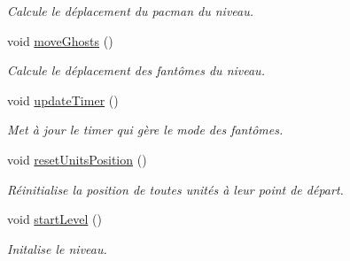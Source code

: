 \begin{DoxyCompactItemize}
\begin{DoxyCompactList}\small\item\em Calcule le déplacement du pacman du niveau. \end{DoxyCompactList}\item 
\hypertarget{class_level_a16b282122a4046e16e8b28bd1471b933}{}void \hyperlink{class_level_a16b282122a4046e16e8b28bd1471b933}{move\+Ghosts} ()\label{class_level_a16b282122a4046e16e8b28bd1471b933}

\begin{DoxyCompactList}\small\item\em Calcule le déplacement des fantômes du niveau. \end{DoxyCompactList}\item 
\hypertarget{class_level_afb52fc19c9f68243db489df978e142ed}{}void \hyperlink{class_level_afb52fc19c9f68243db489df978e142ed}{update\+Timer} ()\label{class_level_afb52fc19c9f68243db489df978e142ed}

\begin{DoxyCompactList}\small\item\em Met à jour le timer qui gère le mode des fantômes. \end{DoxyCompactList}\item 
\hypertarget{class_level_a8ff7672108dac0debe8d0c0dc1590f34}{}void \hyperlink{class_level_a8ff7672108dac0debe8d0c0dc1590f34}{reset\+Units\+Position} ()\label{class_level_a8ff7672108dac0debe8d0c0dc1590f34}

\begin{DoxyCompactList}\small\item\em Réinitialise la position de toutes unités à leur point de départ. \end{DoxyCompactList}\item 
\hypertarget{class_level_af9979f888060289a08dbc72dc7ab5573}{}void \hyperlink{class_level_af9979f888060289a08dbc72dc7ab5573}{start\+Level} ()\label{class_level_af9979f888060289a08dbc72dc7ab5573}

\begin{DoxyCompactList}\small\item\em Initalise le niveau. \end{DoxyCompactList}\end{DoxyCompactItemize}

